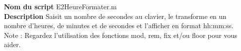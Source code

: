 \textbf{Nom du script}
E2HeureFormater.m\\
\textbf{Description}
Saisit un nombre de secondes au clavier, le transforme en un nombre d'heures, de minutes et de secondes et l'afficher en format hh:mm:ss. Note : Regardez l'utilisation des fonctions mod, rem, fix et/ou floor pour vous aider.